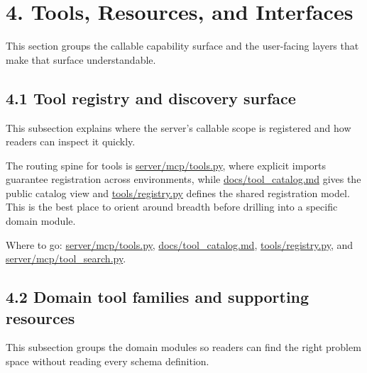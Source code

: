 \section{4. Tools, Resources, and
Interfaces}\label{tools-resources-and-interfaces}

This section groups the callable capability surface and the user-facing
layers that make that surface understandable.

\subsection{4.1 Tool registry and discovery
surface}\label{tool-registry-and-discovery-surface}

This subsection explains where the server's callable scope is registered
and how readers can inspect it quickly.

The routing spine for tools is
\href{https://github.com/chris-page-gov/mcp-geo/blob/fe862910da246ca77f374cfbe484985f5df4d316/server/mcp/tools.py\#L23-L123}{server/mcp/tools.py},
where explicit imports guarantee registration across environments, while
\href{https://github.com/chris-page-gov/mcp-geo/blob/fe862910da246ca77f374cfbe484985f5df4d316/docs/tool_catalog.md\#L1-L61}{docs/tool\_catalog.md}
gives the public catalog view and
\href{https://github.com/chris-page-gov/mcp-geo/blob/fe862910da246ca77f374cfbe484985f5df4d316/tools/registry.py}{tools/registry.py}
defines the shared registration model. This is the best place to orient
around breadth before drilling into a specific domain module.

Where to go:
\href{https://github.com/chris-page-gov/mcp-geo/blob/fe862910da246ca77f374cfbe484985f5df4d316/server/mcp/tools.py\#L1-L260}{server/mcp/tools.py},
\href{https://github.com/chris-page-gov/mcp-geo/blob/fe862910da246ca77f374cfbe484985f5df4d316/docs/tool_catalog.md\#L1-L61}{docs/tool\_catalog.md},
\href{https://github.com/chris-page-gov/mcp-geo/blob/fe862910da246ca77f374cfbe484985f5df4d316/tools/registry.py}{tools/registry.py},
and
\href{https://github.com/chris-page-gov/mcp-geo/blob/fe862910da246ca77f374cfbe484985f5df4d316/server/mcp/tool_search.py}{server/mcp/tool\_search.py}.

\subsection{4.2 Domain tool families and supporting
resources}\label{domain-tool-families-and-supporting-resources}

This subsection groups the domain modules so readers can find the right
problem space without reading every schema definition.

